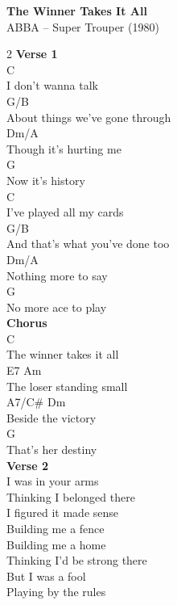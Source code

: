 \documentclass[a4paper]{article}
\begin{document}
    \begin{center}
        \textbf{The Winner Takes It All}
        ~\\
        ABBA -- Super Trouper (1980)
    \end{center}
    {
        \footnotesize

        \begin{multicols}
{2}            \textbf{Verse 1}
            ~\\
            {
                \cutive
                \obeyspaces
              C
\\
I don't wanna talk
\\
                   G/B
\\
About things we've gone through
\\
                    Dm/A
\\
Though it's hurting me
\\
              G
\\
Now it's history
\\
               C
\\
I've played all my cards
\\
                       G/B
\\
And that's what you've done too
\\
                Dm/A
\\
Nothing more to say
\\
               G
\\
No more ace to play
\\

            }
            \textbf{Chorus}
            ~\\
            {
                \cutive
                \obeyspaces
                    C
\\
The winner takes it all
\\
    E7             Am
\\
The loser standing small
\\
  A7/C\#         Dm
\\
Beside the victory
\\
                G
\\
That's her destiny
\\

            }
            \textbf{Verse 2}
            ~\\
            {
                \cutive
                \obeyspaces
I was in your arms
\\
Thinking I belonged there
\\
I figured it made sense
\\
Building me a fence
\\
Building me a home
\\
Thinking I'd be strong there
\\
But I was a fool
\\
Playing by the rules
\\

}
\end{multicols}}
\end{document}
